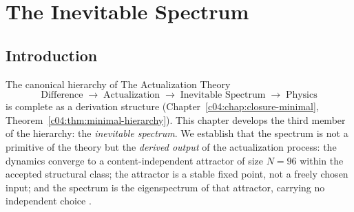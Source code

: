 %
%


\chapter{The Inevitable Spectrum}
\label{c05:chap:spectrum}

\section{Introduction}
\label{c05:sec:spectrum-introduction}

The canonical hierarchy of The Actualization Theory
\begin{equation}
\label{c05:eq:core}
\text{Difference}\;\longrightarrow\;\text{Actualization}\;\longrightarrow\;\text{Inevitable Spectrum}\;\longrightarrow\;\text{Physics}
\end{equation}
is complete as a derivation structure (Chapter~\ref{c04:chap:closure-minimal},
Theorem~\ref{c04:thm:minimal-hierarchy}). This chapter develops the third member of the
hierarchy: the \emph{inevitable spectrum}. We establish that the spectrum is not a primitive
of the theory but the \emph{derived output} of the actualization process: the dynamics
converge to a content-independent attractor of size $N=96$ within the accepted structural
class; the attractor is a stable fixed point, not a freely chosen input; and the spectrum is
the eigenspectrum of that attractor, carrying no independent choice
\cite{c05:QG116,c05:QG282,c05:QG295}.

